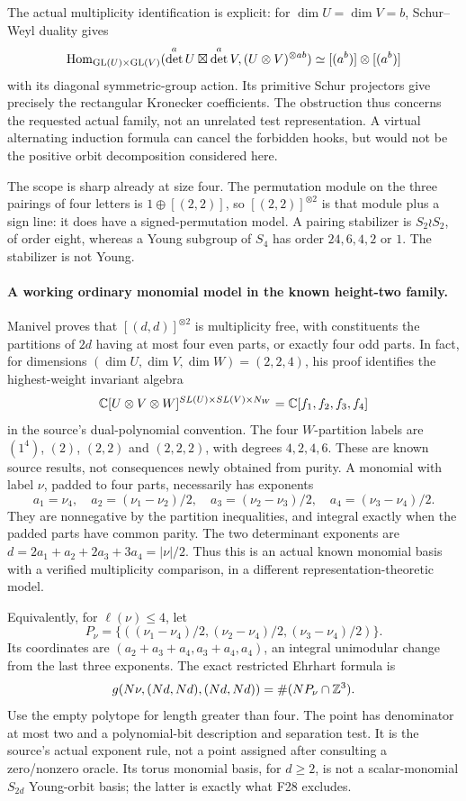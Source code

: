 \documentclass[11pt,a4paper]{article}
\newcommand{\Hom}{\operatorname{Hom}}\newcommand{\Spec}{\operatorname{Spec}}\newcommand{\Tr}{\operatorname{Tr}}\newcommand{\rank}{\operatorname{rank}}\newcommand{\Sym}{\operatorname{Sym}}\newcommand{\Res}{\operatorname{Res}}\newcommand{\IC}{\operatorname{IC}}\newcommand{\Gr}{\operatorname{Gr}}\newcommand{\Rep}{\operatorname{Rep}}\newcommand{\Frob}{\operatorname{Frob}}\newcommand{\End}{\operatorname{End}}
\renewcommand{\S}{\ensuremath{\mathsection}}
\newcommand{\fid}[1]{\textsf{#1}}\newcommand{\gate}[1]{\textsf{#1}}
\theoremstyle{named}\newtheorem{finding}{Finding}[section]
\theoremstyle{definition}\newtheorem{definition}[finding]{Definition}
\theoremstyle{remark}\newtheorem{remark}[finding]{Remark}
\begin{document}
The actual multiplicity identification is explicit: for $\dim U=\dim V=b$,
Schur--Weyl duality gives
\[
 \Hom_{\GL(U)\times\GL(V)}
 (\det^aU\boxtimes\det^aV,(U\otimes V)^{\otimes ab})
 \simeq[(a^b)]\otimes[(a^b)]
\]
with its diagonal symmetric-group action. Its primitive Schur
projectors give precisely the rectangular Kronecker coefficients.
The obstruction thus concerns the requested actual family, not an
unrelated test representation. A virtual alternating induction formula
can cancel the forbidden hooks, but would not be the positive orbit
decomposition considered here.

The scope is sharp already at size four. The permutation module on
the three pairings of four letters is $1\oplus[(2,2)]$, so
$[(2,2)]^{\otimes2}$ is that module plus a sign line: it does have
a signed-permutation model. A pairing stabilizer is
$S_2\wr S_2$, of order eight, whereas a Young subgroup of $S_4$ has
order $24,6,4,2$ or $1$. The stabilizer is not Young.

\paragraph{A working ordinary monomial model in the known height-two family.}
Manivel \cite[Theorem~1, p.~1; \S\S2--3, pp.~2--4]{Manivel} proves
that $[(d,d)]^{\otimes2}$ is multiplicity free, with constituents the
partitions of $2d$ having at most four even parts, or exactly four odd
parts. In fact, for dimensions $(\dim U,\dim V,\dim W)=(2,2,4)$,
his proof identifies the highest-weight invariant algebra
\[
 \mathbb C[U\otimes V\otimes W]^{SL(U)\times SL(V)\times N_W}
 =\mathbb C[f_1,f_2,f_3,f_4]
\]
in the source's dual-polynomial convention. The four $W$-partition
labels are $(1^4)$, $(2)$, $(2,2)$ and $(2,2,2)$, with degrees $4,2,4,6$.
These are known source results, not consequences newly obtained from
purity. A monomial with label $\nu$, padded to four parts, necessarily
has exponents
\[
 a_1=\nu_4,\quad a_2=(\nu_1-\nu_2)/2,\quad
 a_3=(\nu_2-\nu_3)/2,\quad a_4=(\nu_3-\nu_4)/2.
\]
They are nonnegative by the partition inequalities, and integral
exactly when the padded parts have common parity. The two determinant
exponents are $d=2a_1+a_2+2a_3+3a_4=|\nu|/2$.
Thus this is an actual known monomial basis with a verified
multiplicity comparison, in a different representation-theoretic model.

Equivalently, for $\ell(\nu)\le4$, let
\[
 P_\nu=\{((\nu_1-\nu_4)/2,(\nu_2-\nu_4)/2,(\nu_3-\nu_4)/2)\}.
\]
Its coordinates are $(a_2+a_3+a_4,a_3+a_4,a_4)$, an integral
unimodular change from the last three exponents. The exact restricted
Ehrhart formula is
\[
 g(N\nu,(Nd,Nd),(Nd,Nd))=\#(NP_\nu\cap\mathbb Z^3).
\]
Use the empty polytope for length greater than four. The point has
denominator at most two and a polynomial-bit description and
separation test. It is the source's actual exponent rule, not a
point assigned after consulting a zero/nonzero oracle. Its torus
monomial basis, for $d\ge2$, is not a scalar-monomial $S_{2d}$ Young-orbit basis;
the latter is exactly what \fid{F28} excludes.
\end{document}
